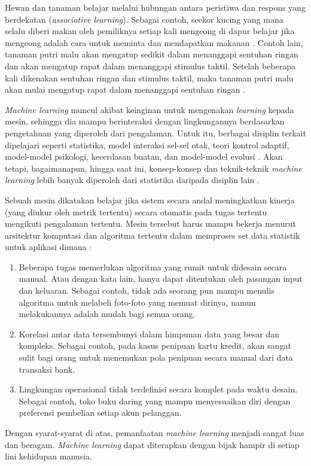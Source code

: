 Hewan dan tanaman belajar melalui hubungan antara peristiwa dan respons yang berdekatan (\textit{associative learning}). Sebagai contoh, seekor kucing yang mana selalu diberi makan oleh pemiliknya setiap kali mengeong di dapur belajar jika mengeong adalah cara untuk meminta dan mendapatkan makanan . Contoh lain, tanaman putri malu akan mengatup sedikit dalam menanggapi sentuhan ringan dan akan mengatup rapat dalam menanggapi stimulus taktil. Setelah beberapa kali dikenakan sentuhan ringan dan stimulus taktil, maka tanaman putri malu akan mulai mengatup rapat dalam menanggapi sentuhan ringan .

\textit{Machine learning}  muncul akibat keinginan untuk mengenakan \textit{learning} kepada mesin, sehingga dia mampu berinteraksi dengan lingkungannya berdasarkan pengetahuan yang diperoleh dari pengalaman. Untuk itu, berbagai disiplin terkait dipelajari seperti statistika, model interaksi sel-sel otak, teori kontrol adaptif, model-model psikologi, kecerdasan buatan, dan model-model evolusi . Akan tetapi, bagaimanapun, hingga saat ini, konsep-konsep dan teknik-teknik \textit{machine learning} lebih banyak diperoleh dari statistika daripada disiplin lain .

Sebuah mesin dikatakan belajar jika sistem secara andal meningkatkan kinerja (yang diukur oleh metrik tertentu) secara otomatis pada tugas tertentu mengikuti pengalaman tertentu. Mesin tersebut harus mampu bekerja menurut arsitektur komputasi dan algoritma tertentu dalam memproses set data statistik untuk aplikasi dimana :
\begin{enumerate}
    \item Beberapa tugas memerlukan algoritma yang rumit untuk didesain secara manual. Atau dengan kata lain, hanya dapat ditentukan oleh pasangan input dan keluaran. Sebagai contoh, tidak ada seorang pun mampu menulis algoritma untuk melabeli foto-foto yang memuat dirinya, namun melakukannya adalah mudah bagi semua orang.
    \item Korelasi antar data tersembunyi dalam himpunan data yang besar dan kompleks. Sebagai contoh, pada kasus penipuan kartu kredit, akan sangat sulit bagi orang untuk menemukan pola penipuan secara manual dari data transaksi bank.
    \item Lingkungan operasional tidak terdefinisi secara komplet pada waktu desain. Sebagai contoh, toko buku daring yang mampu menyesuaikan diri dengan preferensi pembelian setiap akun pelanggan.
\end{enumerate}
Dengan syarat-syarat di atas, pemanfaatan \textit{machine learning} menjadi sangat luas dan beragam. \textit{Machine learning} dapat diterapkan dengan bijak hampir di setiap lini kehidupan manusia.

